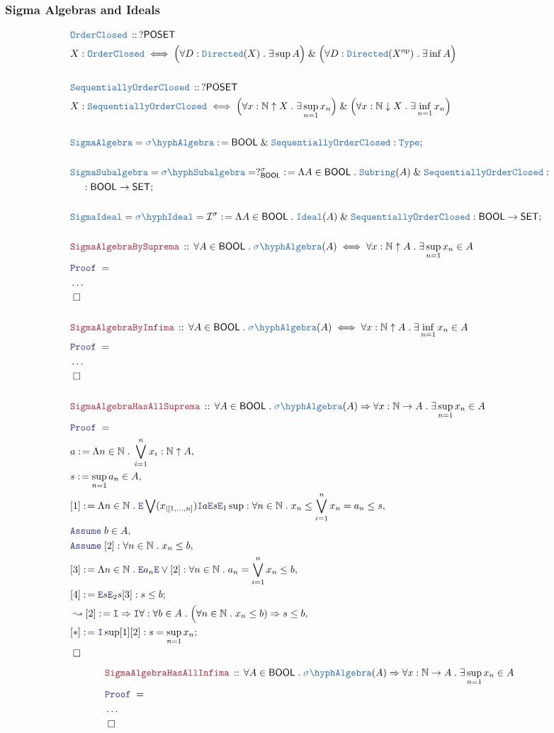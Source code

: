 \documentclass[12pt]{scrartcl}
\newcommand{\TYPE}[1]{\textcolor{NavyBlue}{\mathtt{#1}}}
\newcommand{\LOGIC}[1]{\textcolor{Blue}{\mathtt{#1}}}
\newcommand{\THM}[1]{\textcolor{Maroon}{\mathtt{#1}}}
\renewcommand{\.}{\; . \;}
\newcommand{\de}{: \kern 0.1pc =}
\newcommand{\Theorem}[2]{& \THM{#1} \, :: \, #2 \\ & \Proof = \\ }
\newcommand{\DeclareType}[2]{& \TYPE{#1} \, :: \, #2 \\}
\newcommand{\DefineType}[3]{& #1 : \TYPE{#2} \iff #3 \\}
\newcommand{\NewLine}{\\ & \kern 1pc}
\newcommand{\Page}[1]{ \begin{align*} #1 \end{align*}   }
\newcommand{\NoProof}{ & \ldots \\ \EndProof}
\renewcommand{\And}{\; \& \;}
\newcommand{\Imply}{\Rightarrow}
\newcommand{\Intro}{\LOGIC{I}}
\newcommand{\Elim}{\LOGIC{E}}
\newcommand{\Type}{\TYPE{Type}}
\newcommand{\Nat}{\mathbb{N} }
\newcommand{\Say}[3]{& #1 \de #2 : #3, \\}
\newcommand{\SayIn}[3]{& #1 \de #2 \in #3, \\}
\newcommand{\Conclude}[3]{& #1 \de #2 : #3; \\}
\newcommand{\Derive}[3]{& \leadsto #1 \de #2 : #3, \\}
\newcommand{\Assume}[2]{& \LOGIC{Assume} \; #1 : #2, \\}
\newcommand{\AssumeIn}[2]{& \LOGIC{Assume} \; #1 \in #2, \\}
\newcommand{\QED}{\; \square}
\newcommand{\EndProof}{& \QED \\}
\newcommand{\Proof}{\LOGIC{Proof} \; }
\newcommand{\Ideal}{\TYPE{Ideal}}
\newcommand{\SIdeal}{\TYPE{\sigma\hyph \Ideal}}
\newcommand{\SA}{\TYPE{\sigma \hyph Algebra}}
\newcommand{\op}{\mathrm{op}}
\newcommand{\I}{\mathcal{I}}
\newcommand{\SET}{\mathsf{SET}}
\newcommand{\POSET}{\mathsf{POSET}}
\newcommand{\OC}{\TYPE{OrderClosed}}
\newcommand{\SOC}{\TYPE{SequentiallyOrderClosed}}
\newcommand{\BOOL}{\mathsf{BOOL}}
\begin{document}
\subsubsection{Sigma Algebras and Ideals}
\Page{
	\DeclareType{\OC}{?\POSET}
	\DefineType{X}{\OC}{ 
		\Big(\forall D : \TYPE{Directed}(X) \. \exists \sup A \Big)
		\And
		\Big(\forall D : \TYPE{Directed}(X^{\op}) \. \exists \inf A \Big)
	}
	\\
	\DeclareType{\SOC}{?\POSET}
	\DefineType{X}{\SOC}{ 
		\Big(\forall x : \Nat\uparrow X \. \exists \sup_{n=1} x_n \Big)
		\And
		\Big(\forall x : \Nat \downarrow X \. \exists \inf_{n=1} x_n \Big)
	}
	\\
	\Conclude{\TYPE{SigmaAlgebra}=\SA}{ \BOOL \And \SOC }{\Type}
	\\
	\Conclude{\TYPE{SigmaSubalgebra}=\TYPE{\sigma \hyph Subalgebra} = ?_{\BOOL}^\sigma}
	{ 
		\Lambda A \in \BOOL \.  
		\TYPE{Subring}(A) \And \SOC 
	}{ \NewLine :  \BOOL \to \SET}
	\\
	\Conclude{\TYPE{SigmaIdeal}=\SIdeal = \I^\sigma}
	{ 
		\Lambda A \in \BOOL \.
		\TYPE{Ideal}(A) \And \SOC
	}{\BOOL \to \SET}
	\\
	\Theorem{SigmaAlgebraBySuprema}
	{
		\forall A \in \BOOL \.
		\SA(A)
		\iff
		\forall x : \Nat \uparrow A \. \exists \sup_{n=1} x_n \in A
	}
	\NoProof
	\\
	\Theorem{SigmaAlgebraByInfima}
	{
		\forall A \in \BOOL \.
		\SA(A)
		\iff
		\forall x : \Nat \uparrow A \. \exists \inf_{n=1} x_n \in A
	}
	\NoProof
	\\
	\Theorem{SigmaAlgebraHasAllSuprema}
	{
		\forall A \in \BOOL \.
		\SA(A)
		\Imply
		\forall x : \Nat \to A \. \exists \sup_{n=1} x_n \in A
	}
	\Say{a}{\Lambda n \in \Nat \. \bigvee^n_{i=1} x_i}{ \Nat \uparrow A  }
	\SayIn{s}{\sup_{n=1} a_n}{A}
	\Say{[1]}
	{
		\Lambda n \in \Nat \. \Elim \bigvee(x_{|[1,\ldots,n]}) \Intro a \Elim s \Elim_1 \sup
	}
	{
		\forall n \in \Nat \. x_n \le \bigvee^n_{i=1} x_n = a_n \le s
	}
	\AssumeIn{b}{A}
	\Assume{[2]}{\forall n \in \Nat \. x_n \le b }
	\Say{[3]}{\Lambda n \in \Nat \. \Elim a_n \Elim \vee[2] }{\forall n \in \Nat \. a_n = \bigvee^n_{i=1} x_n \le b}
	\Conclude{[4]}{\Elim s \Elim_2 s [3]}{s \le b}
	\Derive{[2]}{\Intro \Imply \Intro \forall}{  \forall b \in A \. \Big(\forall n \in \Nat \. x_n \le b)  \Imply s \le b }
	\Conclude{[*]}{\Intro \sup [1][2]}{ s = \sup_{n=1} x_n  }
	\EndProof
}\Page{
	\Theorem{SigmaAlgebraHasAllInfima}
	{
		\forall A \in \BOOL \.
		\SA(A) 
		\Imply
		\forall x : \Nat \to A \. \exists \sup_{n=1} x_n \in A
	}
	\NoProof
	\\
}
\end{document}
